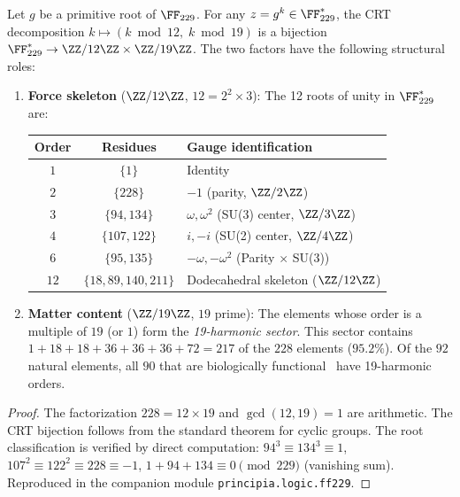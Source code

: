\begin{theorem}\label{thm:force-matter}
Let $g$ be a primitive root of $\FF_{229}$. For any $z = g^k \in \FF_{229}^*$, the CRT decomposition $k \mapsto (k \bmod 12,\; k \bmod 19)$ is a bijection $\FF_{229}^* \to \ZZ/12\ZZ \times \ZZ/19\ZZ$. The two factors have the following structural roles:
\begin{enumerate}
\item \textbf{Force skeleton} ($\ZZ/12\ZZ$, $12 = 2^2 \times 3$): The 12 roots of unity in $\FF_{229}^*$ are:
\begin{center}
\begin{tabular}{@{}ccl@{}}
\toprule
\textbf{Order} & \textbf{Residues} & \textbf{Gauge identification} \\
\midrule
$1$ & $\{1\}$ & Identity \\
$2$ & $\{228\}$ & $-1$ (parity, $\ZZ/2\ZZ$) \\
$3$ & $\{94, 134\}$ & $\omega, \omega^2$ (SU(3) center, $\ZZ/3\ZZ$) \\
$4$ & $\{107, 122\}$ & $i, -i$ (SU(2) center, $\ZZ/4\ZZ$) \\
$6$ & $\{95, 135\}$ & $-\omega, -\omega^2$ (Parity $\times$ SU(3)) \\
$12$ & $\{18, 89, 140, 211\}$ & Dodecahedral skeleton ($\ZZ/12\ZZ$) \\
\bottomrule
\end{tabular}
\end{center}

\item \textbf{Matter content} ($\ZZ/19\ZZ$, $19$ prime): The elements whose order is a multiple of $19$ (or $1$) form the \emph{19-harmonic sector}. This sector contains $1 + 18 + 18 + 36 + 36 + 36 + 72 = 217$ of the $228$ elements ($95.2\%$). Of the $92$ natural elements, all $90$ that are biologically functional~\cite{FraustoDaSilva2001} have 19-harmonic orders.
\end{enumerate}
\end{theorem}

\begin{proof}
The factorization $228 = 12 \times 19$ and $\gcd(12, 19) = 1$ are arithmetic. The CRT bijection follows from the standard theorem for cyclic groups. The root classification is verified by direct computation: $94^3 \equiv 134^3 \equiv 1$, $107^2 \equiv 122^2 \equiv 228 \equiv -1$, $1 + 94 + 134 \equiv 0 \pmod{229}$ (vanishing sum). Reproduced in the companion module \texttt{principia.logic.ff229}. \qedhere
\end{proof}

